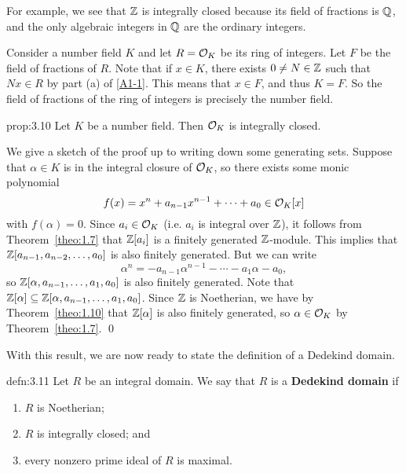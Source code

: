 For example, we see that $\mathbb{Z}$ is integrally closed because its field 
of fractions is $\mathbb{Q}$, and the only algebraic integers in $\mathbb{Q}$ 
are the ordinary integers.

Consider a number field $K$ and let $R = {\cal O}_K$ be its ring of 
integers. Let $F$ be the field of fractions of $R$. Note that 
if $x \in K$, there exists $0 \neq N \in \mathbb{Z}$ such that $Nx \in R$ 
by part (a) of \ref{A1-1}. This means that $x \in F$, and thus $K = F$. 
So the field of fractions of the ring of integers is precisely the number field.

\begin{prop}{prop:3.10}
    Let $K$ be a number field. Then ${\cal O}_K$ is integrally closed. 
\end{prop}\vspace{-0.25cm}
\begin{pf}
    We give a sketch of the proof up to writing down some generating sets.
    Suppose that $\alpha \in K$ is in the integral closure of ${\cal O}_K$, so 
    there exists some monic polynomial 
    \[ f(x) = x^n + a_{n-1} x^{n-1} + \cdots + a_0 \in {\cal O}_K[x] \] 
    with $f(\alpha) = 0$. Since $a_i \in {\cal O}_K$ 
    (i.e. $a_i$ is integral over $\mathbb{Z}$), it follows from Theorem~\ref{theo:1.7}
    that $\mathbb{Z}[a_i]$ is a finitely generated $\mathbb{Z}$-module. This implies that 
    $\mathbb{Z}[a_{n-1}, a_{n-2}, \dots, a_0]$ is also finitely generated. 
    But we can write 
    \[ \alpha^n = -a_{n-1} \alpha^{n-1} - \cdots - a_1\alpha - a_0, \] 
    so $\mathbb{Z}[\alpha, a_{n-1}, \dots, a_1, a_0]$ is also finitely generated. 
    Note that $\mathbb{Z}[\alpha] \subseteq \mathbb{Z}[\alpha, a_{n-1}, \dots, a_1, a_0]$.
    Since $\mathbb{Z}$ is Noetherian, we have by Theorem~\ref{theo:1.10} that 
    $\mathbb{Z}[\alpha]$ is also finitely generated, so $\alpha \in {\cal O}_K$
    by Theorem~\ref{theo:1.7}. \qed
\end{pf}\vspace{-0.25cm}

With this result, we are now ready to state the definition of a Dedekind domain. 

\begin{defn}{defn:3.11}
    Let $R$ be an integral domain. We say that $R$ is a {\bf Dedekind domain} if 
    \begin{enumerate}[(1)]
        \item $R$ is Noetherian;
        \item $R$ is integrally closed; and 
        \item every nonzero prime ideal of $R$ is maximal.
    \end{enumerate}
\end{defn}\vspace{-0.25cm}

